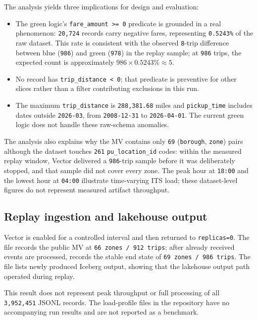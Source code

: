 The analysis yields three implications for design and evaluation:

\begin{itemize}
\item The green logic's \texttt{fare\_amount >= 0} predicate is grounded in a real phenomenon: \texttt{20,724} records carry negative fares, representing \texttt{0.5243\%} of the raw dataset. This rate is consistent with the observed \texttt{8}-trip difference between blue (\texttt{986}) and green (\texttt{978}) in the replay sample; at \texttt{986} trips, the expected count is approximately $986 \times 0.5243\% \approx 5$.
\item No record has \texttt{trip\_distance < 0}; that predicate is preventive for other slices rather than a filter contributing exclusions in this run.
\item The maximum \texttt{trip\_distance} is \texttt{288,381.68} miles and \texttt{pickup\_time} includes dates outside \texttt{2026-03}, from \texttt{2008-12-31} to \texttt{2026-04-01}. The current green logic does not handle these raw-schema anomalies.
\end{itemize}

The analysis also explains why the MV contains only \texttt{69} (\texttt{borough}, \texttt{zone}) pairs although the dataset touches \texttt{261} \texttt{pu\_location\_id} codes: within the measured replay window, Vector delivered a \texttt{986}-trip sample before it was deliberately stopped, and that sample did not cover every zone. The peak hour at \texttt{18:00} and the lowest hour at \texttt{04:00} illustrate time-varying ITS load; these dataset-level figures do not represent measured artifact throughput.

\subsection{Replay ingestion and lakehouse output}
Vector is enabled for a controlled interval and then returned to \texttt{replicas=0}. The file  records the public MV at \texttt{66 zones / 912 trips}; after already received events are processed,  records the stable end state of \texttt{69 zones / 986 trips}. The file  lists newly produced Iceberg output, showing that the lakehouse output path operated during replay.

This result does not represent peak throughput or full processing of all \texttt{3,952,451} JSONL records. The load-profile files in the repository have no accompanying run results and are not reported as a benchmark.

